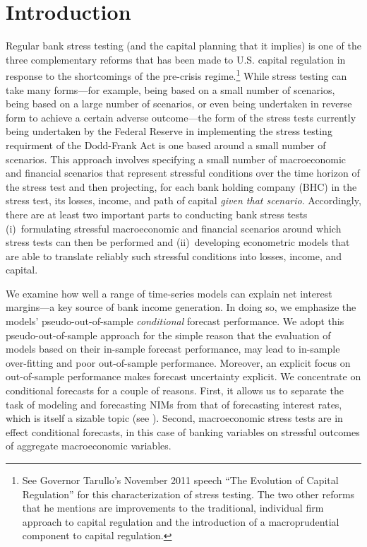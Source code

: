 \documentclass[11pt]{article}
\renewcommand{\baselinestretch}{1.5}
\begin{document}
\renewcommand{\baselinestretch}{1.5} \normalsize
\thispagestyle{empty}

\newpage
\setcounter{page}{1}

\section{Introduction}

\vspace{-0.1in}
Regular bank stress testing (and the capital planning that it implies) is one of the three complementary reforms that has been made to U.S. capital regulation in response to the shortcomings of the pre-crisis regime.\renewcommand{\baselinestretch}{1}\footnote{See Governor Tarullo's November 2011 speech ``The Evolution of Capital Regulation'' for this characterization of stress testing. The two other reforms that he mentions are improvements to the traditional, individual firm approach to capital regulation and the introduction of a macroprudential component to capital regulation.\vspace{0.05in}}\renewcommand{\baselinestretch}{1.5} While stress testing can take many forms---for example, being based on a small number of scenarios, being based on a large number of scenarios, or even being undertaken in reverse form to achieve a certain adverse outcome---the form of the stress tests currently being undertaken by the Federal Reserve in implementing the stress testing requirment of the Dodd-Frank Act is one based around a small number of scenarios.  This approach involves specifying a small number of macroeconomic and financial scenarios that represent stressful conditions over the time horizon of the stress test and then projecting, for each bank holding company (BHC) in the stress test, its losses, income, and path of capital \textit{given that scenario}. Accordingly, there are at least two important parts to conducting bank stress tests (i)~formulating stressful macroeconomic and financial scenarios around which stress tests can then be performed and (ii)~developing econometric models that are able to translate reliably such stressful conditions into losses, income, and capital.

We examine how well a range of time-series models can explain net interest margins---a key source of bank income generation.  In doing so, we emphasize the models' pseudo-out-of-sample \textit{conditional} forecast performance. We adopt this pseudo-out-of-sample approach for the simple reason that the evaluation of models based on their in-sample forecast performance, may lead to in-sample over-fitting and poor out-of-sample performance. Moreover, an explicit focus on out-of-sample performance makes forecast uncertainty explicit. We concentrate on conditional forecasts for a couple of reasons.  First, it allows us to separate the task of modeling and forecasting NIMs from that of forecasting interest rates, which is itself a sizable topic (see ).  Second, macroeconomic stress tests are in effect conditional forecasts, in this case of banking variables on stressful outcomes of aggregate macroeconomic variables.
\end{document}
